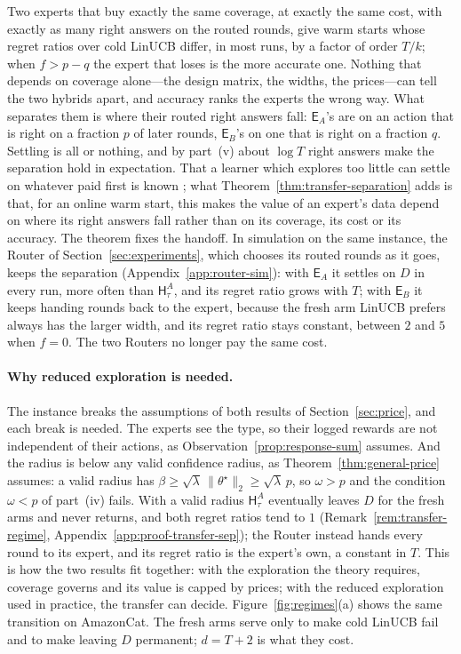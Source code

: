 \documentclass[anon]{alt2027} %
\newcommand{\Exp}{\mathsf{E}}
\newcommand{\Hyb}{\mathsf{H}}
\begin{document}
Two experts that buy exactly the same coverage, at exactly the same cost,
with exactly as many right answers on the routed rounds, give warm starts
whose regret ratios over cold LinUCB differ, in most runs, by a factor of order
$T/k$; when $f>p-q$ the expert that loses is the more accurate one. Nothing
that depends on coverage alone---the design matrix, the widths, the
prices---can tell the two hybrids apart, and accuracy ranks the experts the
wrong way. What separates them is where their routed right answers fall:
$\Exp_A$'s are on an action that is right on a fraction $p$ of later rounds,
$\Exp_B$'s on one that is right on a fraction $q$. Settling is all or nothing, and
by part~(v) about $\log T$ right answers make the separation hold in
expectation. That a learner which explores too little can settle on whatever
paid first is known \citep{bastani2021mostly}; what
Theorem~\ref{thm:transfer-separation} adds is that, for an online warm start,
this makes the value of an expert's data depend on where its right answers
fall rather than on its coverage, its cost or its accuracy.
The theorem fixes the handoff. In simulation on the same instance, the Router
of Section~\ref{sec:experiments}, which chooses its routed rounds as it goes,
keeps the separation (Appendix~\ref{app:router-sim}): with $\Exp_A$ it settles on
$D$ in every run, more often than $\Hyb^A_\tau$, and its regret ratio grows with
$T$; with $\Exp_B$ it keeps handing rounds back to the expert, because the
fresh arm LinUCB prefers always has the larger width, and its regret ratio
stays constant, between $2$ and $5$ when $f=0$. The two Routers no longer pay the same cost.

\paragraph{Why reduced exploration is needed.}
The instance breaks the assumptions of both results of
Section~\ref{sec:price}, and each break is needed. The experts see the type,
so their logged rewards are not independent of their actions, as
Observation~\ref{prop:response-sum} assumes. And the radius is below any valid
confidence radius, as Theorem~\ref{thm:general-price} assumes: a valid radius
has $\beta\ge\sqrt\lambda\,\|\theta^\star\|_2\ge\sqrt\lambda\,p$, so
$\omega>p$ and the condition $\omega<p$ of part~(iv) fails. With a valid
radius $\Hyb^A_\tau$ eventually leaves $D$ for the fresh arms and never
returns, and both regret ratios tend to $1$ (Remark~\ref{rem:transfer-regime},
Appendix~\ref{app:proof-transfer-sep}); the Router instead hands every round to
its expert, and its regret ratio is the expert's own, a constant in $T$. This is how the two results fit
together: with the exploration the theory requires, coverage governs and its
value is capped by prices; with the reduced exploration used in practice,
the transfer can decide. Figure~\ref{fig:regimes}(a) shows the same
transition on AmazonCat. The fresh arms serve only to make cold LinUCB fail
and to make leaving $D$ permanent; $d=T+2$ is what they cost.
\end{document}
